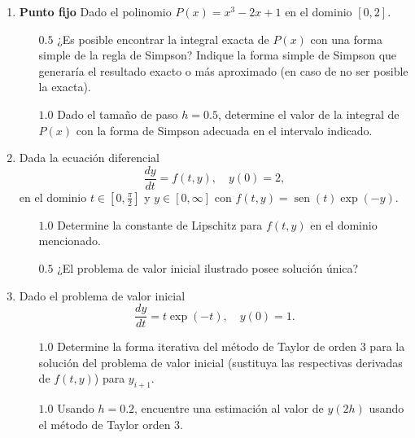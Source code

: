 \documentclass[12pt]{article}
\renewcommand{\sin}{\operatorname{sen}}
\DeclareMathOperator{\sen}{sen}
\renewcommand{\sin}{\sen}
\begin{document}
  \begin{enumerate}[leftmargin=*,widest=9]
    \item \textbf{Punto fijo} Dado el polinomio $P(x) = x^3 - 2x + 1$ en el dominio $[0, 2]$.
    \begin{itemize}
    \item[$0.5$] ¿Es posible encontrar la integral exacta de $P(x)$ con una forma simple de la regla de Simpson? Indique la forma simple de Simpson que generaría el resultado exacto o más aproximado (en caso de no ser posible la exacta).
    \vspace{1cm}
    \item[$1.0$] Dado el tamaño de paso $h= 0.5$, determine el valor de la integral de $P(x)$ con la forma de Simpson adecuada en el intervalo indicado.
    \vspace{4cm}
    \end{itemize}
 \item Dada la ecuación diferencial $$ \frac{dy}{dt} = f(t, y), \quad y(0)= 2,$$ en el dominio $t \in \left[0, \frac{\pi}{2} \right]$ y $y \in [0, \infty]$ con $f(t, y) = \sin(t) \exp(-y)$.
    \begin{itemize}
    \item[$1.0$] Determine la constante de Lipschitz para $f(t, y)$ en el dominio mencionado.
    \vspace{6cm}
    \item[$0.5$] ¿El problema de valor inicial ilustrado posee solución única?
    \vspace{.5cm}
    \end{itemize}
    \item Dado el problema de valor inicial $$ \frac{dy}{dt} = t\exp(-t),\quad y(0)=1. $$
    \begin{itemize}
    \item[$1.0$] Determine la forma iterativa del método de Taylor de orden 3 para la solución del problema de valor inicial (sustituya las respectivas derivadas de $f(t, y)$) para $y_{i+1}$.
    \vspace{6cm}
    \item[$1.0$] Usando $h=0.2$, encuentre una estimación al valor de $y(2h)$ usando el método de Taylor orden 3.
    \end{itemize}
  \end{enumerate}
\end{document}
